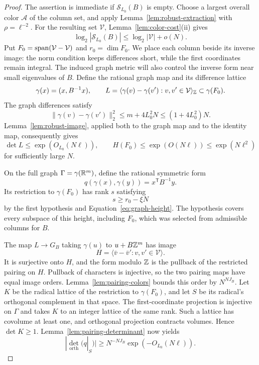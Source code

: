 \begin{proof}
The assertion is immediate if \(\mathcal S_{L_0}(B)\) is empty.
Choose a largest overall color \(\mathcal A\) of the column set,
and apply Lemma~\ref{lem:robust-extraction} with
\(\rho=\ell^{-2}\). For the resulting set \(\mathcal V\),
Lemma~\ref{lem:color-cost}\textup{(ii)} gives
\begin{equation}\label{eq:robust-column-size}
 \log_2|\mathcal S_{L_0}(B)|
 \le\log_2|\mathcal V|+o(N).
\end{equation}
Put \(F_0=\operatorname{span}(\mathcal V-\mathcal V)\) and
\(r_0=\dim F_0\). We place each column beside its inverse
image: the norm condition keeps differences short, while the first
coordinates remain integral. The induced graph metric will also
control the inverse form near small eigenvalues of \(B\). Define
the rational graph map and its difference lattice
\[
 \gamma(x)=(x,B^{-1}x),\qquad
 L=\langle\gamma(v)-\gamma(v'):v,v'\in\mathcal V\rangle_{\mathbb Z}
       \subset\gamma(F_0).
\]
The graph differences satisfy
\[
 \lVert\gamma(v)-\gamma(v')\rVert_2^2
 \le m+4L_0^2N\le(1+4L_0^2)N.
\]
Lemma~\ref{lem:robust-image}, applied both to the graph map and
to the identity map, consequently gives
\begin{equation}\label{eq:graph-height}
 \det L\le\exp(O_{L_0}(N\ell)),
 \qquad H(F_0)\le\exp(O(N\ell))\le\exp(N\ell^2)
\end{equation}
for sufficiently large \(N\).

On the full graph \(\Gamma=\gamma(\mathbb R^m)\), define the rational
symmetric form
\[
 q(\gamma(x),\gamma(y))=x^{\mathsf T}B^{-1}y.
\]
Its restriction to \(\gamma(F_0)\) has rank \(s\) satisfying
\begin{equation}\label{eq:graph-rank}
 s\ge r_0-\xi N
\end{equation}
by the first hypothesis and Equation~\eqref{eq:graph-height}.
The hypothesis covers every subspace of this height, including
\(F_0\), which was selected from admissible columns for \(B\).

The map \(L\to G_B\) taking \(\gamma(u)\) to \(u+B\mathbb Z^m\)
has image
\[
 H=\langle\bar v-\bar v':v,v'\in\mathcal V\rangle.
\]
It is surjective onto \(H\), and the form modulo \(\mathbb Z\) is the
pullback of the restricted pairing on \(H\). Pullback of characters
is injective, so the two pairing maps have equal image orders.
Lemma~\ref{lem:pairing-colors} bounds this order by \(N^{NJ_B}\).
Let \(K\) be the radical lattice of the restriction to
\(\gamma(F_0)\), and let \(S\) be its radical's orthogonal
complement in that space. The first-coordinate projection is
injective on \(\Gamma\) and takes \(K\) to an integer lattice
of the same rank. Such a lattice has covolume at least one, and
orthogonal projection contracts volumes. Hence \(\det K\ge1\).
Lemma~\ref{lem:pairing-determinant} now yields
\begin{equation}\label{eq:graph-det-lower}
 |\det_{\mathrm{orth}}(q|_S)|
 \ge N^{-NJ_B}\exp(-O_{L_0}(N\ell)).
\end{equation}


\end{proof}
